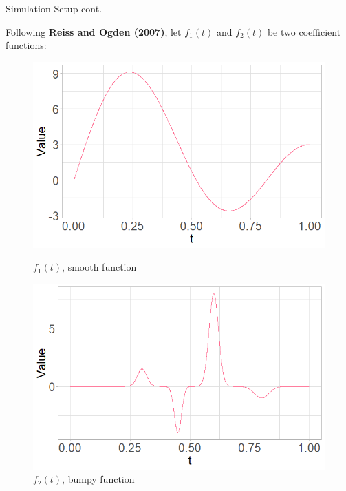 \documentclass{beamer}
\begin{document}
	
	\begin{frame}{Simulation Setup cont.}

		Following \textbf{Reiss and Ogden (2007)}, let $f_1(t)$ and $f_2(t)$ be two coefficient functions: 

		\vspace{0.1cm}
		\begin{figure}
			\centering
			\begin{minipage}{.5\textwidth}
				\centering
  				\includegraphics[width=\textwidth]{smooth_function.png}
  				\caption{$f_1(t)$, smooth function}
  				\label{fig:test1}
			\end{minipage}%
			\begin{minipage}{.5\textwidth}
	  			\centering
  				\includegraphics[width=\textwidth]{bumpy_function.png}
  				\caption{$f_2(t)$, bumpy function}
  				\label{fig:test2}
			\end{minipage}
		\end{figure}
		
	\end{frame}	
\end{document}

